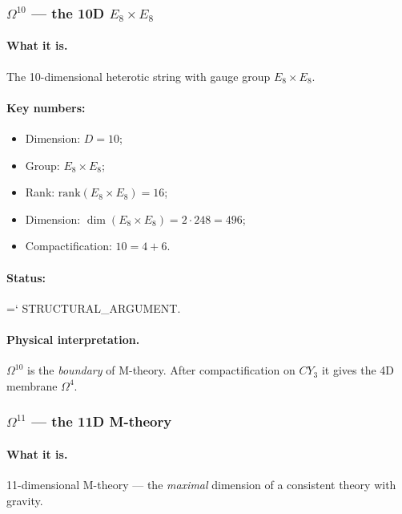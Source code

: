 \documentclass[11pt,a4paper]{article}
\newcommand{\CY}{CY_3}
\newcommand{\Om}{\Omega^4}
\newcommand{\Omt}{\Omega^{10}}
\newcommand{\Ome}{\Omega^{11}}
\renewcommand{\texttt}[1]{{\ttfamily\hyphenchar\font=`\- #1}}
\theoremstyle{definition}
\begin{document}
\subsubsection{$\Omt$ — the 10D $E_8 \times E_8$}

\paragraph{What it is.}
The 10-dimensional heterotic string with gauge group 
$E_8 \times E_8$.

\paragraph{Key numbers:}
\begin{itemize}
    \item Dimension: $D = 10$;
    \item Group: $E_8 \times E_8$;
    \item Rank: $\mathrm{rank}(E_8 \times E_8) = 16$;
    \item Dimension: $\dim(E_8 \times E_8) = 2 \cdot 248 = 496$;
    \item Compactification: $10 = 4 + 6$.
\end{itemize}

\paragraph{Status:} \texttt{STRUCTURAL\_ARGUMENT}.

\paragraph{Physical interpretation.}
$\Omt$ is the \emph{boundary} of M-theory. After compactification 
on $\CY$ it gives the 4D membrane $\Om$.

\subsubsection{$\Ome$ — the 11D M-theory}

\paragraph{What it is.}
11-dimensional M-theory — the \emph{maximal} dimension 
of a consistent theory with gravity.
\end{document}
